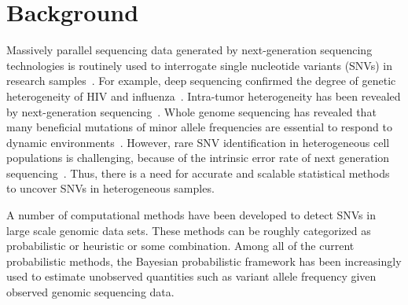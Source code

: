 \documentclass{bmcart}
\begin{document}

\section{Background}
Massively parallel sequencing data generated by next-generation sequencing technologies is routinely used to interrogate single nucleotide variants (SNVs) in research samples~\cite{koboldt2013next}.
For example, deep sequencing confirmed the degree of genetic heterogeneity of HIV and influenza~\cite{flaherty2011ultrasensitive, ghedin2011deep}.
Intra-tumor heterogeneity has been revealed by next-generation sequencing~\cite{navin2010inferring}.
Whole genome sequencing has revealed that many beneficial mutations of minor allele frequencies are essential to respond to dynamic environments~\cite{kvitek2013whole}.
However, rare SNV identification in heterogeneous cell populations is challenging, because of the intrinsic error rate of next generation sequencing~\cite{shendure2008next}.
Thus, there is a need for accurate and scalable statistical methods to uncover SNVs in heterogeneous samples.

A number of computational methods have been developed to detect SNVs in large scale genomic data sets.
These methods can be roughly categorized as probabilistic or heuristic or some combination.
Among all of the current probabilistic methods, the Bayesian probabilistic framework has been increasingly used to estimate unobserved quantities such as variant allele frequency given observed genomic sequencing data.
\end{document}
